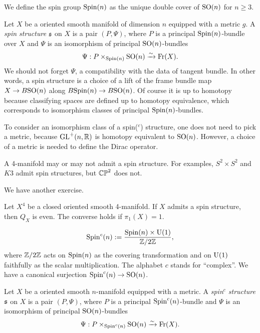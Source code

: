 \documentclass{../../../small}
\begin{document}
We define the spin group $\mathrm{Spin}(n)$ as the unique double cover of $\mathrm{SO}(n)$ for $n\ge3$.

\begin{defn}
Let $X$ be a oriented smooth manifold of dimension $n$ equipped with a metric $g$.
A \emph{spin structure} $\mathfrak{s}$ on $X$ is a pair $(P,\Psi)$, where $P$ is a principal $\mathrm{Spin}(n)$-bundle over $X$ and $\Psi$ is an isomorphism of principal $\mathrm{SO}(n)$-bundles
\[\Psi:P\times_{\mathrm{Spin}(n)}\mathrm{SO}(n)\xrightarrow{\sim}\mathrm{Fr}(X).\]
We should not forget $\Psi$, a compatibility with the data of tangent bundle.
In other words, a spin structure is a choice of a lift of the frame bundle map $X\to B\mathrm{SO}(n)$ along $B\mathrm{Spin}(n)\to B\mathrm{SO}(n)$. Of course it is up to homotopy because classifying spaces are defined up to homotopy equivalence, which corresponds to isomorphism classes of principal $\mathrm{Spin}(n)$-bundles.
\end{defn}

\begin{rmk}
To consider an isomorphism class of a spin($^c$) structure, one does not need to pick a metric, because $\mathrm{GL}^+(n,\mathbb{R})$ is homotopy equivalent to $\mathrm{SO}(n)$.
However, a choice of a metric is needed to define the Dirac operator. 
\end{rmk}

\begin{rmk}
A 4-manifold may or may not admit a spin structure.
For examples, $S^2\times S^2$ and $K3$ admit spin structures, but $\mathbb{CP}^2$ does not.
\end{rmk}

We have another exercise.
\begin{lem}
Let $X^4$ be a closed oriented smooth 4-manifold.
If $X$ admits a spin structure, then $Q_X$ is even.
The converse holds if $\pi_1(X)=1$.
\end{lem}


\begin{defn}
\[\mathrm{Spin}^c(n):=\frac{\mathrm{Spin}(n)\times\mathrm{U}(1)}{\mathbb{Z}/2\mathbb{Z}},\]
where $\mathbb{Z}/2\mathbb{Z}$ acts on $\mathrm{Spin}(n)$ as the covering transformation and on $\mathrm{U}(1)$ faithfully as the scalar multiplication.
The alphabet $c$ stands for ``complex''.
We have a canonical surjection $\mathrm{Spin}^c(n)\to\mathrm{SO}(n)$.
\end{defn}

\begin{defn}
Let $X$ be a oriented smooth $n$-manifold equipped with a metric.
A \emph{spin$^c$ structure} $\mathfrak{s}$ on $X$ is a pair $(P,\Psi)$, where $P$ is a principal $\mathrm{Spin}^c(n)$-bundle and $\Psi$ is an isomorphism of principal $\mathrm{SO}(n)$-bundles
\[\Psi:P\times_{\mathrm{Spin}^c(n)}\mathrm{SO}(n)\xrightarrow{\sim}\mathrm{Fr}(X).\]
\end{defn}
\end{document}
